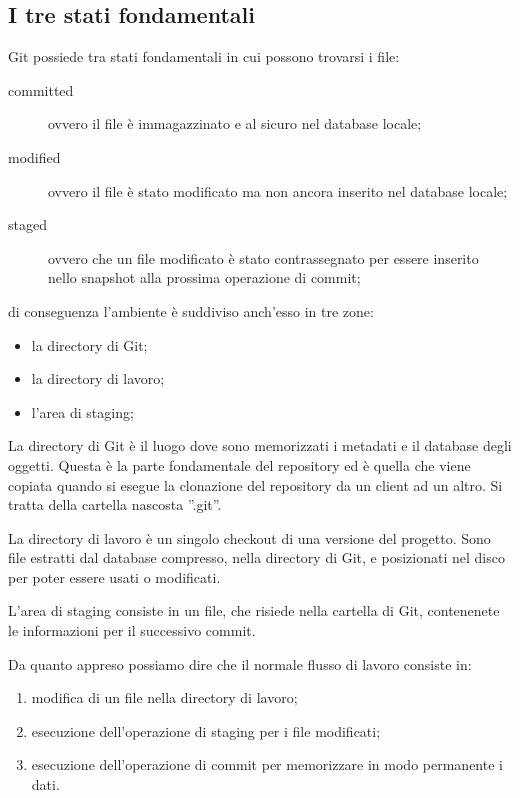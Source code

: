 \subsection{I tre stati fondamentali}
Git possiede tra stati fondamentali in cui possono trovarsi i file:

\begin{description}
\item[committed] ovvero il file è immagazzinato e al sicuro nel database locale;
\item[modified] ovvero il file è stato modificato ma non ancora inserito nel database locale;
\item[staged] ovvero che un file modificato è stato contrassegnato per essere inserito nello snapshot alla prossima operazione di commit;
\end{description}

di conseguenza l'ambiente è suddiviso anch'esso in tre zone:

\begin{itemize}
\item la directory di Git;
\item la directory di lavoro;
\item l'area di staging;
\end{itemize}

La directory di Git è il luogo dove sono memorizzati i metadati e il database degli oggetti. Questa è la parte fondamentale del repository ed è quella che viene copiata quando si esegue la clonazione del repository da un client ad un altro. Si tratta della cartella nascosta ''.git''.

La directory di lavoro è un singolo checkout di una versione del progetto. Sono file estratti dal database compresso, nella directory di Git, e posizionati nel disco per poter essere usati o modificati.

L'area di staging consiste in un file, che risiede nella cartella di Git, contenenete le informazioni per il successivo commit.

Da quanto appreso possiamo dire che il normale flusso di lavoro consiste in:

\begin{enumerate}
\item modifica di un file nella directory di lavoro;
\item esecuzione dell'operazione di staging per i file modificati;
\item esecuzione dell'operazione di commit per memorizzare in modo permanente i dati.
\end{enumerate}